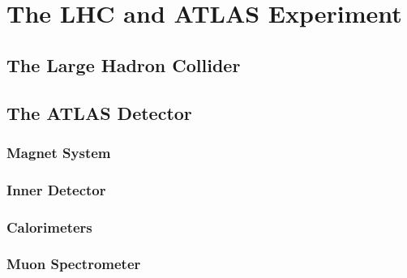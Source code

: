 \chapter{The LHC and ATLAS Experiment}
\section{The Large Hadron Collider}
\section{The ATLAS Detector}
\subsection{Magnet System}
\subsection{Inner Detector}
\subsection{Calorimeters}
\subsection{Muon Spectrometer}



